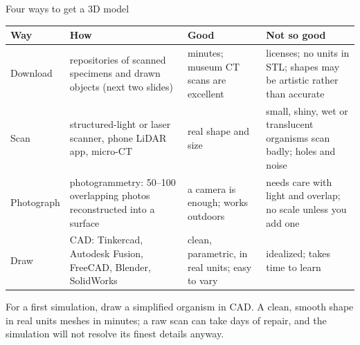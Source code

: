 \documentclass[aspectratio=169,11pt]{beamer}
\begin{document}
\begin{frame}{Four ways to get a 3D model}
\scriptsize
\begin{tabular}{@{}L{0.12\textwidth}L{0.28\textwidth}L{0.26\textwidth}L{0.25\textwidth}@{}}
\toprule
Way & How & Good & Not so good\\
\midrule
Download & repositories of scanned specimens and drawn objects (next two slides) & minutes; museum CT scans are excellent & licenses; no units in STL; shapes may be artistic rather than accurate\\
Scan & structured-light or laser scanner, phone LiDAR app, micro-CT & real shape and size & small, shiny, wet or translucent organisms scan badly; holes and noise\\
Photograph & photogrammetry: 50--100 overlapping photos reconstructed into a surface & a camera is enough; works outdoors & needs care with light and overlap; no scale unless you add one\\
Draw & CAD: Tinkercad, Autodesk Fusion, FreeCAD, Blender, SolidWorks & clean, parametric, in real units; easy to vary & idealized; takes time to learn\\
\bottomrule
\end{tabular}
\vspace{2mm}
\begin{punchbox}
\small For a first simulation, draw a simplified organism in CAD. A clean, smooth shape in real units meshes in minutes; a raw scan can take days of repair, and the simulation will not resolve its finest details anyway.
\end{punchbox}
\end{frame}
\end{document}
